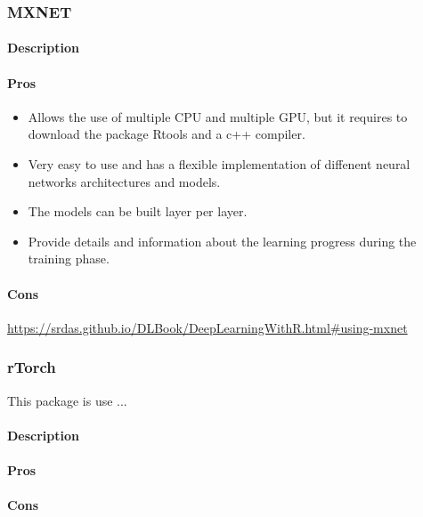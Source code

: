 \documentclass[6pt,letter]{article}\usepackage[]{graphicx}\usepackage[]{color}
\begin{document}
\subsubsection{MXNET}
\paragraph{Description}
\paragraph{Pros}
\begin{itemize}
\item Allows the use of multiple CPU and multiple GPU, but it requires to download the package Rtools and a c++ compiler.
\item Very easy to use and has a flexible implementation of diffenent neural networks architectures and models.
\item The models can be built layer per layer.
\item Provide details and information about the learning progress during the training phase.
\end{itemize}
\paragraph{Cons}

\url{https://srdas.github.io/DLBook/DeepLearningWithR.html#using-mxnet}

\subsubsection{rTorch}
This package is use ...\cite{rTorch2019}

\paragraph{Description}
\paragraph{Pros}
\paragraph{Cons}

\end{document}
